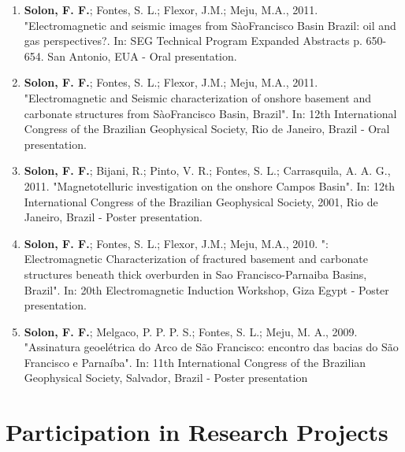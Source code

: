 \documentclass[10pt,a4paper,sans]{moderncv} %
\begin{document}
\begin{enumerate}
\item \textbf{Solon, F. F.}; Fontes, S. L.; Flexor, J.M.; Meju, M.A., 2011. "Electromagnetic and seismic images from S\`{a}oFrancisco Basin Brazil: oil and gas perspectives?. In: SEG Technical Program Expanded Abstracts p. 650-654. San Antonio, EUA - Oral presentation.\\

\item \textbf{Solon, F. F.}; Fontes, S. L.; Flexor, J.M.; Meju, M.A., 2011. "Electromagnetic and Seismic characterization of onshore basement and carbonate structures from S\`{a}oFrancisco Basin, Brazil". In: 12th International Congress of the Brazilian Geophysical Society, Rio de Janeiro, Brazil - Oral presentation.\\

\item \textbf{Solon, F. F.}; Bijani, R.; Pinto, V. R.; Fontes, S. L.; Carrasquila, A. A. G., 2011. "Magnetotelluric investigation on the onshore Campos Basin". In: 12th International Congress of the Brazilian Geophysical Society, 2001, Rio de Janeiro, Brazil - Poster presentation.\\

\item \textbf{Solon, F. F.}; Fontes, S. L.; Flexor, J.M.; Meju, M.A., 2010. ": Electromagnetic Characterization of fractured basement and carbonate structures beneath thick overburden in Sao Francisco-Parnaiba Basins, Brazil". In: 20th Electromagnetic Induction Workshop, Giza Egypt - Poster presentation.\\

\item \textbf{Solon, F. F.}; Melgaco, P. P. P. S.; Fontes, S. L.; Meju, M. A., 2009. "Assinatura geoel\'{e}trica do Arco de S\~{a}o Francisco: encontro das bacias do S\~{a}o Francisco e Parna\'{i}ba". In: 11th International Congress of the Brazilian Geophysical Society, Salvador, Brazil - Poster presentation \\

\end{enumerate}


\section{Participation in Research Projects}

\end{document}

